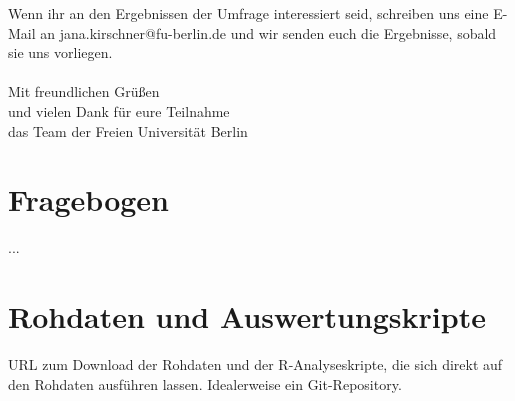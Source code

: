 \documentclass[de]{agse-empir-report}\usepackage[]{graphicx}\usepackage[]{color}
\begin{document}
Wenn ihr an den Ergebnissen der Umfrage interessiert seid, schreiben uns eine E-Mail an jana.kirschner@fu-berlin.de und wir senden euch die Ergebnisse, sobald sie uns vorliegen.\\ \\

Mit freundlichen Grüßen\\
und vielen Dank für eure Teilnahme\\ 
das Team der Freien Universität Berlin\\



\section{Fragebogen}

...


\section{Rohdaten und Auswertungskripte}

URL zum Download der Rohdaten und der R-Analyseskripte, die sich direkt auf den
Rohdaten ausführen lassen.
Idealerweise ein Git-Repository.
\end{document}
